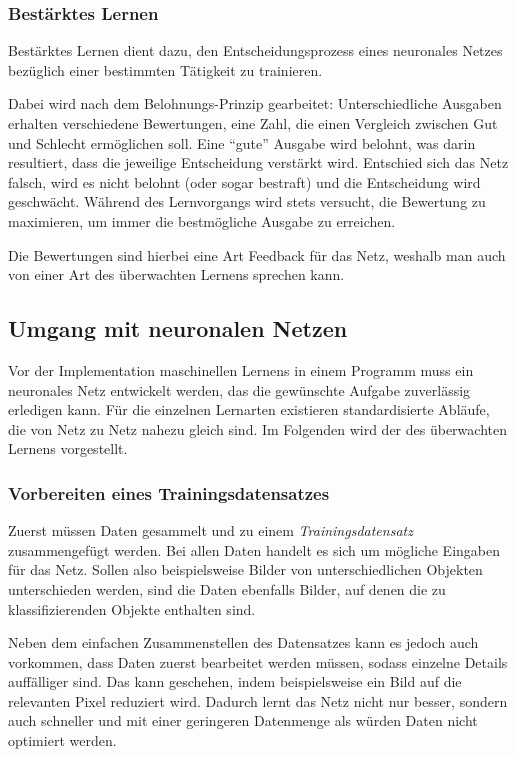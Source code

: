 \documentclass[12pt,a4]{article}
\begin{document}
\subsubsection{Bestärktes Lernen}\label{sec:ReinforcementLearning}
Bestärktes Lernen dient dazu, den Entscheidungsprozess eines neuronales Netzes bezüglich einer bestimmten Tätigkeit zu trainieren.

Dabei wird nach dem Belohnungs-Prinzip gearbeitet: Unterschiedliche Ausgaben erhalten verschiedene Bewertungen, eine Zahl, die einen Vergleich zwischen Gut und Schlecht ermöglichen soll. Eine \enquote{gute} Ausgabe wird belohnt, was darin resultiert, dass die jeweilige Entscheidung verstärkt wird. Entschied sich das Netz falsch, wird es nicht belohnt (oder sogar bestraft) und die Entscheidung wird geschwächt.
Während des Lernvorgangs wird stets versucht, die Bewertung zu maximieren, um immer die bestmögliche Ausgabe zu erreichen.

Die Bewertungen sind hierbei eine Art Feedback für das Netz, weshalb man auch von einer Art des überwachten Lernens sprechen kann.

\subsection{Umgang mit neuronalen Netzen \cite{PythonMachineLearningChapter1}}\label{sec:HandlingNetworks}
Vor der Implementation maschinellen Lernens in einem Programm muss ein neuronales Netz entwickelt werden, das die gewünschte Aufgabe zuverlässig erledigen kann. Für die einzelnen Lernarten existieren standardisierte Abläufe, die von Netz zu Netz nahezu gleich sind. Im Folgenden wird der des überwachten Lernens vorgestellt.

\subsubsection{Vorbereiten eines Trainingsdatensatzes}\label{sec:TrainingData}
Zuerst müssen Daten gesammelt und zu einem \textit{Trainingsdatensatz} zusammengefügt werden.
Bei allen Daten handelt es sich um mögliche Eingaben für das Netz. Sollen also beispielsweise Bilder von unterschiedlichen Objekten unterschieden werden, sind die Daten ebenfalls Bilder, auf denen die zu klassifizierenden Objekte enthalten sind.

Neben dem einfachen Zusammenstellen des Datensatzes kann es jedoch auch vorkommen, dass Daten zuerst bearbeitet werden müssen, sodass einzelne Details auffälliger sind. Das kann geschehen, indem beispielsweise ein Bild auf die relevanten Pixel reduziert wird. Dadurch lernt das Netz nicht nur besser, sondern auch schneller und mit einer geringeren Datenmenge als würden Daten nicht optimiert werden.
\end{document}
